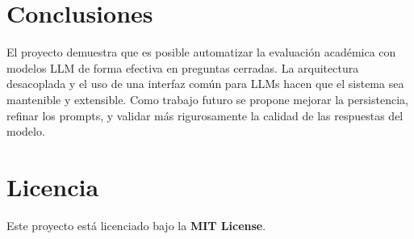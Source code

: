 \documentclass[12pt]{article}
\begin{document}
\section{Conclusiones}
El proyecto demuestra que es posible automatizar la evaluación académica con modelos LLM de forma efectiva en preguntas cerradas. La arquitectura desacoplada y el uso de una interfaz común para LLMs hacen que el sistema sea mantenible y extensible. Como trabajo futuro se propone mejorar la persistencia, refinar los prompts, y validar más rigurosamente la calidad de las respuestas del modelo.

\section*{Licencia}
Este proyecto está licenciado bajo la \textbf{MIT License}.
\end{document}
